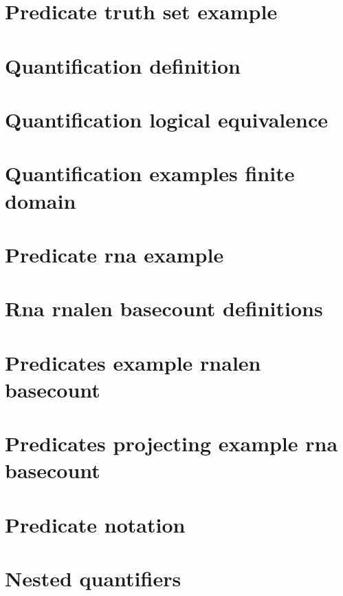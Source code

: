 \section*{Predicate truth set example}

\vfill
\section*{Quantification definition}

\vfill
\section*{Quantification logical equivalence}

\vfill
\section*{Quantification examples finite domain}

\vfill
\section*{Predicate rna example}

\vfill
\section*{Rna rnalen basecount definitions}

\vfill
\section*{Predicates example rnalen basecount}

\vfill
\section*{Predicates projecting example rna basecount}

\vfill
\section*{Predicate notation}

\vfill
\section*{Nested quantifiers}

\vfill
